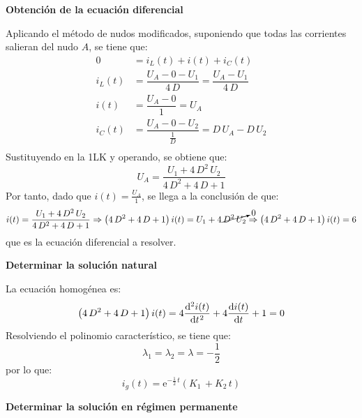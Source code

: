 \documentclass[11pt]{book} %
\begin{document}
\begin{example}
	    \textbf{Obtención de la ecuación diferencial}
	    
	    Aplicando el método de nudos modificados, suponiendo que todas las corrientes salieran del nudo $A$, se tiene que: 
	    \begin{align*}
	        0&=i_L(t)+i(t)+i_C(t)\\
	        i_L(t)&=\dfrac{U_A-0-U_1}{4\,D}=\dfrac{U_A-U_1}{4\,D}\\
	        i(t)&=\dfrac{U_A-0}{1}=U_A\\
	        i_C(t)&=\dfrac{U_A-0-U_2}{\frac{1}{D}}=D\,U_A-D\,U_2\\
	    \end{align*}
	Sustituyendo en la 1LK y operando, se obtiene que:
	\begin{equation*}
	    U_A=\dfrac{U_1+4\,D^2\,U_2}{4\,D^2+4\,D+1}
	\end{equation*}
	Por tanto, dado que $i(t)=\frac{U_A}{1}$, se llega a la conclusión de que:
	\begin{equation*}
	    i(t)=\dfrac{U_1+4\,D^2\,U_2}{4\,D^2+4\,D+1}\Rightarrow \left(4\,D^2+4\,D+1\right) i(t)=U_1+4\,\cancelto{0}{D^2\,U_2}\Rightarrow \left(4\,D^2+4\,D+1\right) i(t)=6
	\end{equation*}
    que es la ecuación diferencial a resolver. 
	    
	    \textbf{Determinar la solución natural}
	    
	    La ecuación homogénea es: 
	    \begin{equation*}
	        \left(4\,D^2+4\,D+1\right) i(t)=4\diff[2]{i(t)}{t}+4\diff{i(t)}{t}+1=0
	    \end{equation*}
    Resolviendo el polinomio característico, se tiene que: 
    \begin{equation*}
        \lambda_1=\lambda_2=\lambda=-\dfrac{1}{2}
    \end{equation*}
    por lo que: 
    \begin{equation*}
        i_g(t)=\mathrm{e}^{-\frac{1}{2}\,t}(K_1\,+K_2\,t) 
    \end{equation*}
	    
	    \textbf{Determinar la solución en régimen permanente}
	    

\end{example}
\end{document}
